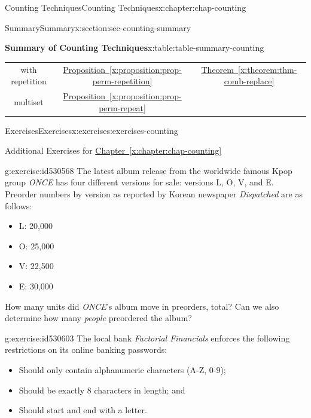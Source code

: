 \documentclass[oneside,10pt,]{book}
\newcommand{\xreffont}{\relax}
\numberwithin{equation}{section}
\begin{document}
\begin{chapterptx}{Counting Techniques}{}{Counting Techniques}{}{}{x:chapter:chap-counting}
\begin{sectionptx}{Summary}{}{Summary}{}{}{x:section:sec-counting-summary}
\begin{tableptx}{\textbf{Summary of Counting Techniques}}{x:table:table-summary-counting}{}
{\begin{tabular}{ccc}
with repetition&\hyperref[x:proposition:prop-perm-repetition]{Proposition~{\xreffont\ref{x:proposition:prop-perm-repetition}}}&\hyperref[x:theorem:thm-comb-replace]{Theorem~{\xreffont\ref{x:theorem:thm-comb-replace}}}\tabularnewline[0pt]
multiset&\hyperref[x:proposition:prop-perm-repeat]{Proposition~{\xreffont\ref{x:proposition:prop-perm-repeat}}}&\textendash{} \textendash{} \textendash{} \textendash{} \textendash{}
\end{tabular}
}%
\end{tableptx}%
\end{sectionptx}
%
%
\typeout{************************************************}
\typeout{************************************************}
%
\begin{exercises-section}{Exercises}{}{Exercises}{}{}{x:exercises:exercises-counting}
\begin{introduction}{}%
Additional Exercises for \hyperref[x:chapter:chap-counting]{Chapter~{\xreffont\ref{x:chapter:chap-counting}}}%
\end{introduction}%
\begin{divisionexercise}{1}{}{}{g:exercise:id530568}%
The latest album release from the worldwide famous Kpop group \emph{ONCE} has four different versions for sale: versions L, O, V, and E. Preorder numbers by version as reported by Korean newspaper \emph{Dispatched} are as follows:%
\begin{itemize}[label=\textbullet]
\item{}L: 20,000%
\item{}O: 25,000%
\item{}V: 22,500%
\item{}E: 30,000%
\end{itemize}
How many units did \emph{ONCE}'s album move in preorders, total? Can we also determine how many \emph{people} preordered the album?%
\end{divisionexercise}%
\begin{divisionexercise}{2}{}{}{g:exercise:id530603}%
The local bank \emph{Factorial Financials} enforces the following restrictions on its online banking passwords:%
\begin{itemize}[label=\textbullet]
\item{}Should only contain alphanumeric characters (A-Z, 0-9);%
\item{}Should be exactly 8 characters in length; and%
\item{}Should start and end with a letter.%
\end{itemize}

\end{divisionexercise}
\end{exercises-section}
\end{chapterptx}
\end{document}
